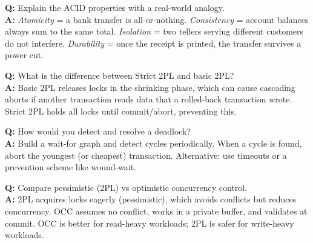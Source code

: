 \begin{interviewbox}
\textbf{Q:} Explain the ACID properties with a real-world analogy.\\[4pt]
\textbf{A:} \emph{Atomicity} = a bank transfer is all-or-nothing.  \emph{Consistency} = account balances always sum to the same total.  \emph{Isolation} = two tellers serving different customers do not interfere.  \emph{Durability} = once the receipt is printed, the transfer survives a power cut.

\vspace{6pt}
\textbf{Q:} What is the difference between Strict 2PL and basic 2PL?\\[4pt]
\textbf{A:} Basic 2PL releases locks in the shrinking phase, which can cause cascading aborts if another transaction reads data that a rolled-back transaction wrote.  Strict 2PL holds all locks until commit/abort, preventing this.

\vspace{6pt}
\textbf{Q:} How would you detect and resolve a deadlock?\\[4pt]
\textbf{A:} Build a wait-for graph and detect cycles periodically.  When a cycle is found, abort the youngest (or cheapest) transaction.  Alternative: use timeouts or a prevention scheme like wound-wait.

\vspace{6pt}
\textbf{Q:} Compare pessimistic (2PL) vs optimistic concurrency control.\\[4pt]
\textbf{A:} 2PL acquires locks eagerly (pessimistic), which avoids conflicts but reduces concurrency.  OCC assumes no conflict, works in a private buffer, and validates at commit.  OCC is better for read-heavy workloads; 2PL is safer for write-heavy workloads.
\end{interviewbox}
